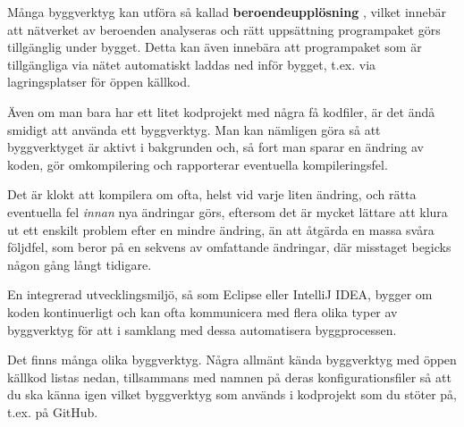 Många byggverktyg kan utföra så kallad \textbf{beroendeupplösning} , vilket innebär att nätverket av beroenden analyseras och rätt uppsättning programpaket görs tillgänglig under bygget. Detta kan även innebära att programpaket som är tillgängliga via nätet automatiskt laddas ned inför bygget, t.ex. via lagringsplatser för öppen källkod.

Även om man bara har ett litet kodprojekt med några få kodfiler, är det ändå smidigt att använda ett byggverktyg. Man kan nämligen göra så att byggverktyget är aktivt i bakgrunden och, så fort man sparar en ändring av koden, gör omkompilering och rapporterar eventuella kompileringsfel.

Det är klokt att kompilera om ofta, helst vid varje liten ändring, och rätta eventuella fel \textit{innan} nya ändringar görs, eftersom det är mycket lättare att klura ut ett enskilt problem efter en mindre ändring, än att åtgärda en massa svåra följdfel, som beror på en sekvens av omfattande ändringar, där misstaget begicks någon gång långt tidigare.

En integrerad utvecklingsmiljö, så som Eclipse eller IntelliJ IDEA, bygger om koden kontinuerligt och kan ofta kommunicera med flera olika typer av byggverktyg för att i samklang med dessa automatisera byggprocessen.

Det finns många olika byggverktyg. Några allmänt kända byggverktyg med öppen källkod listas nedan, tillsammans med namnen på deras konfigurationsfiler så att du ska känna igen vilket byggverktyg som används i  kodprojekt som du stöter på, t.ex. på GitHub.

